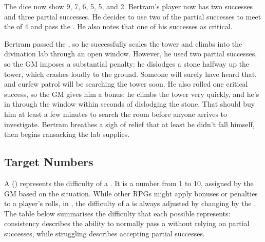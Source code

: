 The dice now show 9, 7, 6, 5, 5, and 2.
Bertram's player now has two successes and three partial successes.
He decides to use two of the partial successes to meet the {\tn} of 4 and pass the {\test}.
He also notes that one of his successes as critical.

Bertram passed the {\test}, so he successfully scales the tower and climbs into the divination lab through an open window.
However, he used two partial successes, so the GM imposes a substantial penalty: he dislodges a stone halfway up the tower, which crashes loudly to the ground.
Someone will surely have heard that, and curfew patrol will be searching the tower soon.
He also rolled one critical success, so the GM gives him a bonus: he climbs the tower very quickly, and he's in through the window within seconds of dislodging the stone.
That should buy him at least a few minutes to search the room before anyone arrives to investigate.
Bertram breathes a sigh of relief that at least he didn't fall himself, then begins ransacking the lab supplies.

\subsection{Target Numbers}

A {\targetnumber} ({\tn}) represents the difficulty of a {\test}.
It is a number from 1 to 10, assigned by the GM based on the situation.
While other RPGs might apply bonuses or penalties to a player's rolls, in , the difficulty of a {\test} is always adjusted by changing by the {\tn}.
The table below summarises the difficulty that each possible {\tn} represents: consistency describes the ability to normally pass a {\test} without relying on partial successes, while struggling describes accepting partial successes.

